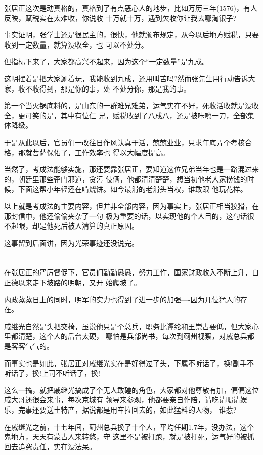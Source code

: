 \documentclass[11pt,a4paper,onecolumn]{article}
\begin{document}
张居正这次是动真格的，真格到了有点恶心人的地步，比如万历三年(1576)，有人反映，赋税实在太难收，你说收
十万就十万，遇到欠收你让我去哪淘银子?

事实证明，张学士还是很民主的，很快，他就颁布规定，从今以后地方赋税，只要收到一定数量，就算没收全，也
可以不处分。

但指标下来了，大家都高兴不起来，因为这个``一定数量''是九成。

这明摆着是把大家涮着玩，我能收到九成，还用叫苦吗?然而张先生用行动告诉大家，收不收得到，那是你的事，处
不处分你，那是我的事。

第一个当火锅底料的，是山东的一群难兄难弟，运气实在不好，死收活收就是没收全，更可笑的是，其中有位仁
兄，赋税收到了八成八，还是被咔嚓一刀，全部集体降级。

于是从此以后，官员们一改往日作风认真干活，兢兢业业，只求年底弄个考核合格，那就菩萨保佑了，工作效率也
得以大幅度提高。

当然了，考成法能够实施，那还要靠张居正，要知道这位兄弟当年也是一路混过来的，朝廷里那些歪门邪道，贪污
伎俩，他都清清楚楚，想当初他老人家捞钱的时候，下面这帮小年轻还在啃烧饼。如今最滑的老滑头当权，谁敢跟
他玩花样。

以上就是考成法的主要内容，但并非全部内容，因为事实上，张居正相当狡猾，在那封信中，他还偷偷夹杂了一句
极为重要的话，以实现他的个人目的，这句话很不起眼，却是他死后被人清算的真正原因。

这事留到后面讲，因为光荣事迹还没说完。

\section[\thesection]{}

在张居正的严厉督促下，官员们勤勤恳恳，努力工作，国家财政收入不断上升，自正德以来走下坡路的明朝，又开
始爬坡了。

内政蒸蒸日上的同时，明军的实力也得到了进一步的加强----因为几位猛人的存在。

戚继光自然是头把交椅，虽说他只是个总兵，职务比谭纶和王崇古要低，但大家心里都清楚，这个人的后台太硬，
哪怕是兵部尚书，每次到蓟州视察，对戚总兵都是客客气气的。

而事实也是如此，张居正对戚继光实在是好得过了头，下属不听话了，换!副手不听话了，换!上司不听话了，换!

这么一搞，就把戚继光搞成了个无人敢碰的角色，大家都对他尊敬有加，偏偏这位戚大哥还很会来事，每次京城有
领导来参观，他都要亲自作陪，请吃请喝请娱乐，完事还要送土特产，据说都是用车拉回去的，如此猛料的人物，
谁惹?

在戚继光之前，十七年间，蓟州总兵换了十个人，平均任期1.7年，没办法，这个鬼地方，天天有蒙古人来转悠，守
这里不是被打跑，就是被打死，运气好的被抓回去追究责任，实在没法呆。
\end{document}
